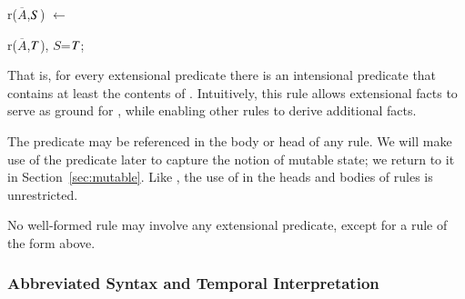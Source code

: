 \begin{dedalus}
r\pos($\overline{A}$,\(\DS\)) \(\leftarrow\)
\end{dedalus}

\hspace{5mm}
\begin{dedalus}
   r($\overline{A}$,\(\DT\)), \(S\)=\(\DT\);
\end{dedalus}

That is, for every extensional predicate  there is an intensional
predicate  that contains at least the contents of .
Intuitively, this rule allows extensional facts to serve as ground for
, while enabling other rules to derive additional  facts.

The predicate  may be referenced in the body or head of any \lang rule.  
We will make use of the predicate  later to capture the notion of mutable state; we return to it in Section~\ref{sec:mutable}. 
Like , the use of  in the heads and bodies of rules is unrestricted.

\vspace{1.2em}
No well-formed \lang rule may involve any extensional predicate, except for a rule of the form above.

\subsubsection{Abbreviated Syntax and Temporal Interpretation}

\label{sec:abbrvsyntax}



